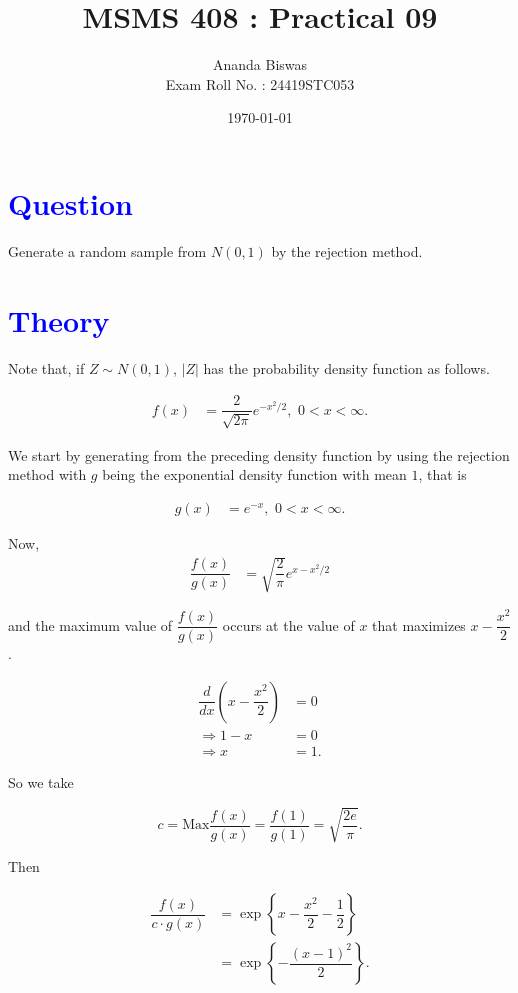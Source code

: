 \documentclass[11pt, a4paper]{article}\usepackage[]{graphicx}\usepackage[]{xcolor}
\title{MSMS 408 : Practical 09}
\author{Ananda Biswas \\[1em] Exam Roll No. : 24419STC053}
\date{\today}
\begin{document}
\maketitle


\section*{\faArrowAltCircleRight[regular] \textcolor{blue}{Question}}

\hspace{1cm} Generate a random sample from $N(0, 1)$ by the rejection method.

\section*{\faArrowAltCircleRight[regular] \textcolor{blue}{Theory}}

Note that, if $Z \sim N(0, 1)$, $|Z|$ has the probability density function as follows.

\begin{align}\label{PDF_of_mod_Z}
f(x) &= \dfrac{2}{\sqrt{2\pi}} e^{-x^2 / 2}, \,\, 0 < x < \infty.
\end{align}

We start by generating from the preceding density function by using the rejection method with $g$ being the exponential density function with mean $1$, that is

\begin{align*}
g(x) &= e^{-x}, \,\, 0 < x < \infty.
\end{align*}

Now, 
\begin{align*}
\dfrac{f(x)}{g(x)} &= \sqrt{\dfrac{2}{\pi}} e^{x - x^2 / 2}
\end{align*}

and the maximum value of $\dfrac{f(x)}{g(x)}$ occurs at the value of $x$ that maximizes $x - \dfrac{x^2}{2}$.

\begin{align*}
\dfrac{d}{dx} \left(x - \dfrac{x^2}{2}\right) &= 0 \\[0.2em]
\Rightarrow 1 - x &= 0 \\[0.2em]
\Rightarrow x &= 1.
\end{align*}

So we take

$$c = \text{Max} \dfrac{f(x)}{g(x)} = \dfrac{f(1)}{g(1)} = \sqrt{\dfrac{2e}{\pi}}.$$

Then

\begin{align*}
\dfrac{f(x)}{c \cdot g(x)} &= \exp \! \left\{ x - \dfrac{x^2}{2} - \dfrac{1}{2} \right\} \\[0.2em]
&= \exp \! \left\{ - \dfrac{(x-1)^2}{2} \right\}.
\end{align*}
\end{document}
